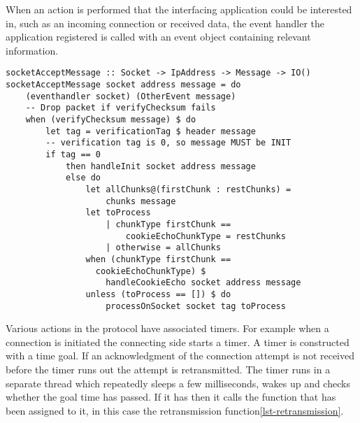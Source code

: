 When an action is performed that the interfacing application could be interested in, such as an incoming connection or received data, the event handler the application registered is called with an event object containing relevant information.

\begin{lstlisting}[caption={socketAcceptMessage decides what to do with a message},label={lst-socketacceptmessage}]
socketAcceptMessage :: Socket -> IpAddress -> Message -> IO()
socketAcceptMessage socket address message = do
    (eventhandler socket) (OtherEvent message)
    -- Drop packet if verifyChecksum fails
    when (verifyChecksum message) $ do
        let tag = verificationTag $ header message
        -- verification tag is 0, so message MUST be INIT
        if tag == 0 
            then handleInit socket address message
            else do
                let allChunks@(firstChunk : restChunks) =
                    chunks message
                let toProcess
                    | chunkType firstChunk ==
                        cookieEchoChunkType = restChunks
                    | otherwise = allChunks
                when (chunkType firstChunk == 
                  cookieEchoChunkType) $
                    handleCookieEcho socket address message
                unless (toProcess == []) $ do
                    processOnSocket socket tag toProcess
\end{lstlisting}

Various actions in the protocol have associated timers. For example when a connection is initiated the connecting side starts a timer. A timer is constructed with a time goal. If an acknowledgment of the connection attempt is not received before the timer runs out the attempt is retransmitted.
The timer runs in a separate thread which repeatedly sleeps a few milliseconds, wakes up and checks whether the goal time has passed. If it has then it calls the function that has been assigned to it, in this case the retransmission function\ref{lst-retransmission}.

